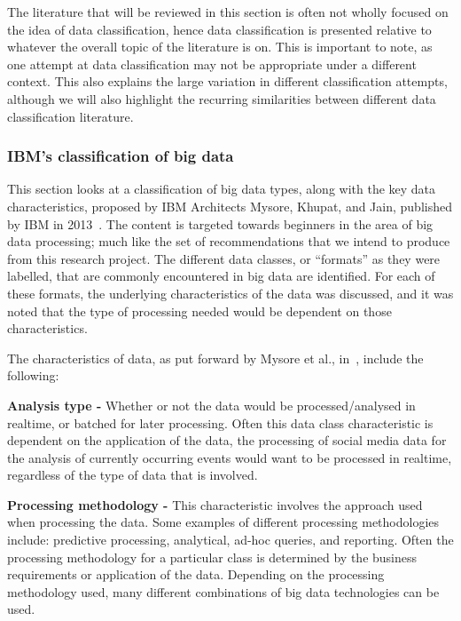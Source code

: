 \documentclass[a4paper,11pt]{article}
\begin{document}
The literature that will be reviewed in this section is often not wholly focused on the idea of data classification,
hence data classification is presented relative to whatever the overall topic of the literature is on. This is important
to note, as one attempt at data classification may not be appropriate under a different context. This also explains the
large variation in different classification attempts, although we will also highlight the recurring similarities between
different data classification literature.


\subsubsection{IBM's classification of big data}
\label{ssub:data_charact}

This section looks at a classification of big data types, along with the key data characteristics, proposed by IBM
Architects Mysore, Khupat, and Jain, published by IBM in 2013~\cite{ibm_big_2013}. The content is targeted towards
beginners in the area of big data processing; much like the set of recommendations that we intend to produce from this
research project. The different data classes, or ``formats'' as they were labelled, that are commonly encountered in big
data are identified. For each of these formats, the underlying characteristics of the data was discussed, and it was
noted that the type of processing needed would be dependent on those characteristics.

\noindent The characteristics of data, as put forward by Mysore et al., in~\cite{ibm_big_2013}, include the following:

\noindent \textbf{Analysis type -} Whether or not the data would be processed/analysed in realtime, or batched for later
processing. Often this data class characteristic is dependent on the application of the data, \eg{}the processing of
social media data for the analysis of currently occurring events would want to be processed in realtime, regardless of
the type of data that is involved.

\noindent \textbf{Processing methodology -} This characteristic involves the approach used when processing the data. Some examples
of different processing methodologies include: predictive processing, analytical, ad-hoc queries, and reporting. Often
the processing methodology for a particular class is determined by the business requirements or application of the
data. Depending on the processing methodology used, many different combinations of big data technologies can be used.
\end{document}
